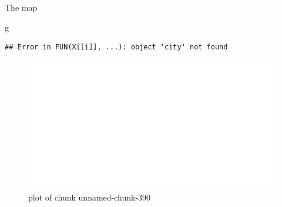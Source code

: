 \documentclass[ignorenonframetext,]{beamer}
\newenvironment{Shaded}{\begin{snugshade}}{\end{snugshade}}
\newcommand{\NormalTok}[1]{#1}
\begin{document}
\begin{frame}[fragile]{The map}
\protect\hypertarget{the-map}{}

\begin{Shaded}
\begin{Highlighting}[]
\NormalTok{g}
\end{Highlighting}
\end{Shaded}

\begin{verbatim}
## Error in FUN(X[[i]], ...): object 'city' not found
\end{verbatim}

\begin{figure}
\centering
\includegraphics{figure/unnamed-chunk-390-1.pdf}
\caption{plot of chunk unnamed-chunk-390}
\end{figure}

\end{frame}
\end{document}

